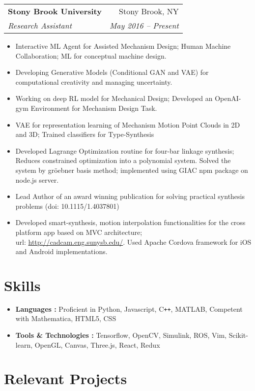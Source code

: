 \documentclass[letterpaper,10pt]{article}
\makeatletter
\newcommand{\resumeHeading}[4]{
  \vspace{-1pt}
    \begin{tabular*}{0.97\textwidth}{l@{\extracolsep{\fill}}r}
      \textbf{#1} & #2 \vspace{-2pt}\\ \vspace{1pt}
      \textit{\small#3} & \textit{\small #4} \\
    \end{tabular*}
}
\newcommand{\resumeSubheadingNew}[1]{
      {\small{#1}} \\
}
\newcommand{\resumeSection}[1]{
\vspace{-12pt}
\section{\textbf{#1}}
}
\newcommand{\resumeItemListStart}{
\vspace{-7pt}
\begin{itemize}[leftmargin=14pt]
}
\newcommand{\resumeItemListEnd}{
\vspace{+7pt}
\end{itemize}
}
\newcommand{\resumeItem}[1]{
  \item\small{
      {#1 \vspace{-7pt}
      }
  }
}
\makeatother
\begin{document}
    \resumeHeading
      {Stony Brook University}{Stony Brook, NY}
      {Research Assistant}{May 2016 -- Present}
      \resumeItemListStart
        \resumeItem{Interactive ML Agent for Assisted Mechanism Design; Human Machine Collaboration; ML for conceptual machine design.}
        \resumeItem{Developing Generative Models (Conditional GAN and VAE) for computational creativity and managing uncertainty.}
        \resumeItem{Working on deep RL model for Mechanical Design; Developed an OpenAI-gym Environment for Mechanism Design Task.}
        \resumeItem{VAE for representation learning of Mechanism Motion Point Clouds in 2D and 3D; Trained classifiers for Type-Synthesis}
        \resumeItem{Developed Lagrange Optimization routine for four-bar linkage synthesis; Reduces constrained optimization into a polynomial system.
          Solved the system by gr\"{o}ebner basis method; implemented using GIAC npm package on node.js server.}
        \resumeItem{Lead Author of an award winning publication for solving practical synthesis problems (doi: 10.1115/1.4037801)}
        \resumeItem{Developed smart-synthesis, motion interpolation functionalities for the cross platform app based on MVC architecture; \\ url: \href{http://cadcam.eng.sunysb.edu/}{http://cadcam.eng.sunysb.edu/}. Used Apache Cordova framework for iOS and Android implementations.}
      \resumeItemListEnd


\resumeSection{Skills}
\vspace{+7pt}
    \resumeItemListStart
      \resumeItem{\textbf{Languages :} Proficient in Python, Javascript, C\texttt{++}, MATLAB, Competent with Mathematica, HTML5, CSS}
      \resumeItem{\textbf{Tools \& Technologies :} Tensorflow, OpenCV, Simulink, ROS, Vim, Scikit-learn, OpenGL, Canvas, Three.js, React, Redux}
    \resumeItemListEnd


    \resumeSection{Relevant Projects}
\end{document}
